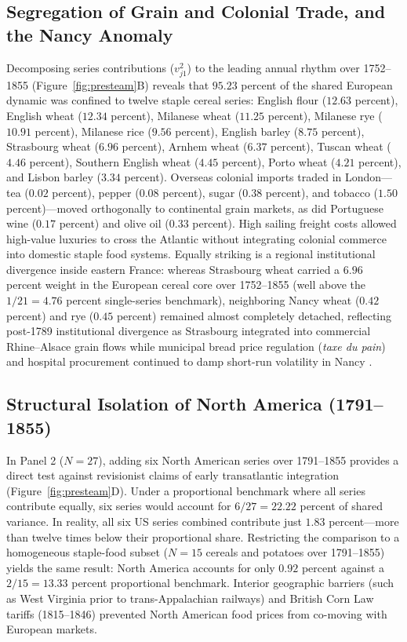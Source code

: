 \documentclass{article}
\begin{document}
\subsection{Segregation of Grain and Colonial Trade, and the Nancy Anomaly}
Decomposing series contributions ($v_{j1}^2$) to the leading annual rhythm over 1752--1855 (Figure~\ref{fig:presteam}B) reveals that $95.23$ percent of the shared European dynamic was confined to twelve staple cereal series: English flour ($12.63$ percent), English wheat ($12.34$ percent), Milanese wheat ($11.25$ percent), Milanese rye ($10.91$ percent), Milanese rice ($9.56$ percent), English barley ($8.75$ percent), Strasbourg wheat ($6.96$ percent), Arnhem wheat ($6.37$ percent), Tuscan wheat ($4.46$ percent), Southern English wheat ($4.45$ percent), Porto wheat ($4.21$ percent), and Lisbon barley ($3.34$ percent).
Overseas colonial imports traded in London---tea ($0.02$ percent), pepper ($0.08$ percent), sugar ($0.38$ percent), and tobacco ($1.50$ percent)---moved orthogonally to continental grain markets, as did Portuguese wine ($0.17$ percent) and olive oil ($0.33$ percent). High sailing freight costs allowed high-value luxuries to cross the Atlantic without integrating colonial commerce into domestic staple food systems. Equally striking is a regional institutional divergence inside eastern France: whereas Strasbourg wheat carried a $6.96$ percent weight in the European cereal core over 1752--1855 (well above the $1/21 = 4.76$ percent single-series benchmark), neighboring Nancy wheat ($0.42$ percent) and rye ($0.45$ percent) remained almost completely detached, reflecting post-1789 institutional divergence as Strasbourg integrated into commercial Rhine--Alsace grain flows while municipal bread price regulation (\textit{taxe du pain}) and hospital procurement continued to damp short-run volatility in Nancy \cite{persson1999}.
\subsection{Structural Isolation of North America (1791--1855)}
In Panel 2 ($N=27$), adding six North American series over 1791--1855 provides a direct test against revisionist claims of early transatlantic integration (Figure~\ref{fig:presteam}D). Under a proportional benchmark where all series contribute equally, six series would account for $6/27 = 22.22$ percent of shared variance. In reality, all six US series combined contribute just $1.83$ percent---more than twelve times below their proportional share. Restricting the comparison to a homogeneous staple-food subset ($N=15$ cereals and potatoes over 1791--1855) yields the same result: North America accounts for only $0.92$ percent against a $2/15 = 13.33$ percent proportional benchmark. Interior geographic barriers (such as West Virginia prior to trans-Appalachian railways) and British Corn Law tariffs (1815--1846) prevented North American food prices from co-moving with European markets.
\end{document}

